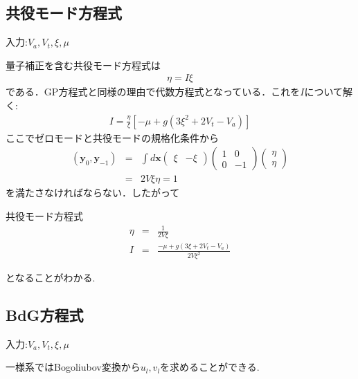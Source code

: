 \documentclass[10.5pt,a4paper]{jreport}
\begin{document}
\subsection{共役モード方程式}
入力:$V_a, V_t, \xi, \mu$

量子補正を含む共役モード方程式は
\begin{eqnarray}
  [-\mu + g(3\xi^2 + 2V_t - V_a)]\eta = I\xi 
\end{eqnarray}
である．GP方程式と同様の理由で代数方程式となっている．これを$I$について解く:
\begin{eqnarray}
  I = \frac{\eta}{\xi}[-\mu + g(3\xi^2 + 2V_t - V_a)]
\end{eqnarray}
ここでゼロモードと共役モードの規格化条件から
\begin{eqnarray}
  \nonumber  (\bm{y}_0, \bm{y}_{-1}) &=& \int d\bm{x}
  \begin{pmatrix}
    \xi & -\xi
  \end{pmatrix}
  \begin{pmatrix}
    1 & 0\\
    0 & -1
  \end{pmatrix}
  \begin{pmatrix}
    \eta\\
    \eta
  \end{pmatrix}\\
  &=& 2V\xi\eta = 1
\end{eqnarray}
を満たさなければならない．したがって
\begin{itembox}[c]{共役モード方程式}
  \begin{eqnarray}
    \eta &=& \frac{1}{2V\xi}\\
    I &=& \frac{-\mu + g(3\xi + 2V_t - V_a)}{2V\xi^2}
  \end{eqnarray}
\end{itembox}
となることがわかる.

\subsection{BdG方程式}
入力:$V_a, V_t, \xi, \mu$

一様系ではBogoliubov変換から$u_l,v_l$を求めることができる.
\end{document}
